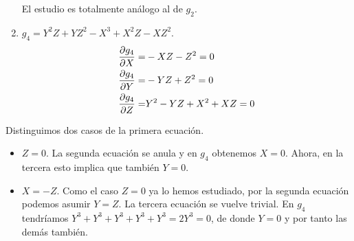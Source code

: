 \documentclass[twoside]{article}
\begin{document}
\begin{solucion}
\begin{enumerate}
El estudio es totalmente análogo al de $g_2$.

\item $g_4=Y^2Z + YZ^2 - X^3 + X^2Z - XZ^2$.
\begin{align*}
\frac{\partial g_4}{\partial X}=& -XZ-Z^2=0\\
\frac{\partial g_4}{\partial Y}=& -YZ+Z^2=0\\
\frac{\partial g_4}{\partial Z}=& Y^2-YZ+X^2+XZ=0
\end{align*}
\end{enumerate}
Distinguimos dos casos de la primera ecuación.
\begin{itemize}
\item $Z=0$. La segunda ecuación se anula y en $g_4$ obtenemos $X=0$. Ahora, en la tercera esto implica que también $Y=0$.
\item $X=-Z$. Como el caso $Z=0$ ya lo hemos estudiado, por la segunda ecuación podemos asumir $Y=Z$. La tercera ecuación se vuelve trivial. En $g_4$ tendríamos $Y^3+Y^3+Y^3+Y^3+Y^3=2Y^3=0$, de donde $Y=0$ y por tanto las demás también.
\end{itemize}
\end{solucion}

\newpage
\end{document}
